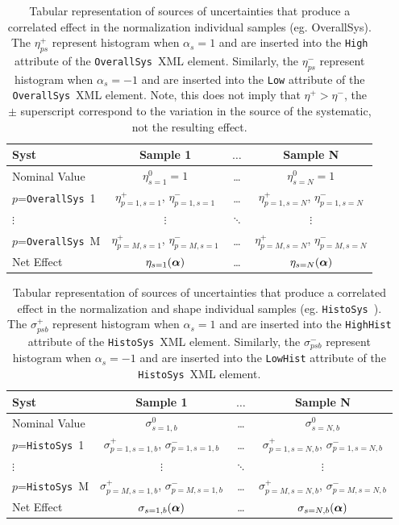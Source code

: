 \documentclass{cernrep}
\def\vec#1{\ifmmode
\mathchoice{\mbox{\boldmath$\displaystyle\bf#1$}}
{\mbox{\boldmath$\textstyle\bf#1$}}
{\mbox{\boldmath$\scriptstyle\bf#1$}}
{\mbox{\boldmath$\scriptscriptstyle\bf#1$}}\else
{\mbox{\boldmath$\bf#1$}}\fi}
\newcommand{\OS}{\texttt{OverallSys}}
\newcommand{\HS}{\texttt{HistoSys}}
\begin{document}
\begin{table}[h]
\center
\begin{tabular}{l | c c c}
Syst & Sample 1 & $\dots$ & Sample N \\ \hline
Nominal Value & $\eta_{s=1}^0=1$ & \dots & $\eta_{s=N}^0=1$\\\hline
$p$=\OS\ 1 & $\eta_{p=1,s=1}^+$, \;$\eta_{p=1,s=1}^-$ & \dots & $\eta_{p=1,s=N}^+$,\; $\eta_{p=1,s=N}^-$\\ 
$\vdots$ & $\vdots$ & $\ddots$ & $\vdots$ \\
$p$=\OS\ M & $\eta_{p=M,s=1}^+$, $\eta_{p=M,s=1}^-$ & \dots & $\eta_{p=M,s=N}^+$, $\eta_{p=M,s=N}^-$\\ \hline
Net Effect & $\eta_{s=1}(\vec{\alpha})$ & \dots & $\eta_{s=N}(\vec{\alpha})$
\end{tabular}
\caption{Tabular representation of sources of uncertainties that produce a correlated effect in the normalization individual samples (eg. OverallSys).  The $\eta^+_{ps}$ represent histogram when $\alpha_s=1$ and are inserted into the \texttt{High} attribute of the \OS\  XML element.  Similarly, the $\eta^-_{ps}$ represent histogram when $\alpha_s=-1$ and are inserted into the \texttt{Low} attribute of the \OS\  XML element. Note, this does not imply that $\eta^+ > \eta^-$, the $\pm$ superscript correspond to the variation in the source of the systematic, not the resulting effect.}
\end{table}

\begin{table}[h]
\center
\begin{tabular}{l | c c c}
Syst & Sample 1 & $\dots$ & Sample N \\ \hline
Nominal Value & $\sigma_{s=1,b}^0$ & \dots & $\sigma_{s=N,b}^0$\\\hline
$p$=\HS\  1\;\; & $\sigma_{p=1,s=1,b}^+$, $\sigma_{p=1,s=1,b}^-$ & \dots & $\sigma_{p=1,s=N,b}^+$, $\sigma_{p=1,s=N,b}^-$\\ 
$\vdots$ & $\vdots$ & $\ddots$ & $\vdots$ \\
$p$=\HS\  M \;\;\;\;& $\sigma_{p=M,s=1,b}^+$, \;\;$\sigma_{p=M,s=1,b}^-$ \;\;& \dots & $\sigma_{p=M,s=N,b}^+$, \;\; $\sigma_{p=M,s=N,b}^-$\;\;\\ \hline
Net Effect & $\sigma_{s=1,b}(\vec{\alpha})$ & \dots & $\sigma_{s=N,b}(\vec{\alpha})$
\end{tabular}
\caption{Tabular representation of sources of uncertainties that produce a correlated effect in the normalization and shape individual samples (eg. \HS\ ).  The $\sigma^+_{psb}$ represent histogram when $\alpha_s=1$ and are inserted into the \texttt{HighHist} attribute of the \HS\  XML element.  Similarly, the $\sigma^-_{psb}$ represent histogram when $\alpha_s=-1$ and are inserted into the \texttt{LowHist} attribute of the \HS\  XML element.   }
\end{table}
\end{document}
